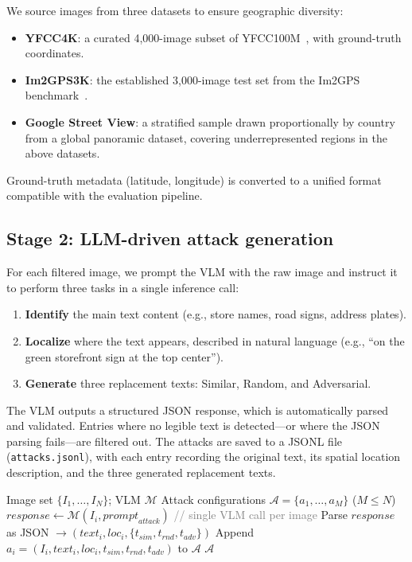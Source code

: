 \documentclass[12pt,a4paper]{article}
\newcommand{\algcomment}[1]{\hfill\textcolor{gray}{\small // #1}}
\begin{document}
We source images from three datasets to ensure geographic diversity:
\begin{itemize}[leftmargin=2em]
  \item \textbf{YFCC4K}: a curated 4,000-image subset of YFCC100M~\cite{yfcc100m}, with ground-truth coordinates.
  \item \textbf{Im2GPS3K}: the established 3,000-image test set from the Im2GPS benchmark~\cite{im2gps}.
  \item \textbf{Google Street View}: a stratified sample drawn proportionally by country from a global panoramic dataset, covering underrepresented regions in the above datasets.
\end{itemize}

Ground-truth metadata (latitude, longitude) is converted to a unified format compatible with the evaluation pipeline.

\subsection{Stage 2: LLM-driven attack generation}
For each filtered image, we prompt the VLM with the raw image and instruct it to perform three tasks in a single inference call:

\begin{enumerate}[leftmargin=2em]
  \item \textbf{Identify} the main text content (e.g., store names, road signs, address plates).
  \item \textbf{Localize} where the text appears, described in natural language (e.g., ``on the green storefront sign at the top center'').
  \item \textbf{Generate} three replacement texts: Similar, Random, and Adversarial.
\end{enumerate}

The VLM outputs a structured JSON response, which is automatically parsed and validated. Entries where no legible text is detected---or where the JSON parsing fails---are filtered out. The attacks are saved to a JSONL file (\texttt{attacks.jsonl}), with each entry recording the original text, its spatial location description, and the three generated replacement texts.

\begin{algorithm}[H]
  \caption{LLM-Driven Attack Generation (\texttt{generate\_attacks.py})}
  \begin{algorithmic}[1]
    \Require Image set $\{I_1, \ldots, I_N\}$; VLM $\mathcal{M}$
    \Ensure Attack configurations $\mathcal{A} = \{a_1, \ldots, a_M\}$ \quad ($M \le N$)
      \State $\mathit{response} \leftarrow \mathcal{M}(I_i, \mathit{prompt}_{attack})$ \algcomment{single VLM call per image}
      \State Parse $\mathit{response}$ as JSON $\to (text_i, loc_i, \{t_{sim}, t_{rnd}, t_{adv}\})$
        \State Append $a_i = (I_i, text_i, loc_i, t_{sim}, t_{rnd}, t_{adv})$ to $\mathcal{A}$
      \EndIf
    \EndFor
    \State \Return $\mathcal{A}$
  \end{algorithmic}
\end{algorithm}
\end{document}
